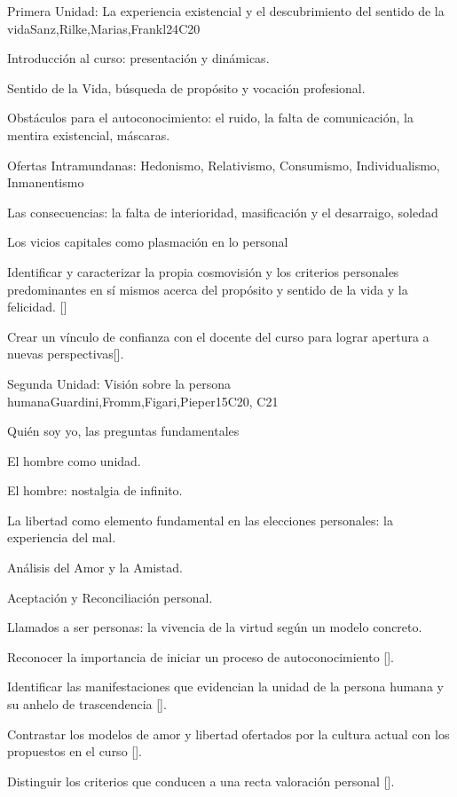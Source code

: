 \begin{syllabus}
\begin{unit}{}{Primera Unidad: La experiencia existencial y el descubrimiento del sentido de la vida}{Sanz,Rilke,Marias,Frankl}{24}{C20}
\begin{topics}
	\item Introducción al curso: presentación y dinámicas.
	\item Sentido de la Vida, búsqueda de propósito y vocación profesional.
	\item Obstáculos para el autoconocimiento: el ruido, la falta de comunicación, la mentira existencial, máscaras.
	\item Ofertas Intramundanas: Hedonismo, Relativismo, Consumismo, Individualismo, Inmanentismo
	\item Las consecuencias: la falta de interioridad, masificación y el desarraigo, soledad
	\item Los vicios capitales como plasmación en lo personal
\end{topics}
\begin{learningoutcomes}
	\item Identificar y caracterizar la propia cosmovisión y los criterios personales predominantes en sí mismos acerca del propósito y sentido de la vida y la felicidad. [\Usage]
	\item Crear un vínculo de confianza con el docente del curso para lograr apertura a nuevas perspectivas[\Usage].
\end{learningoutcomes}
\end{unit}

\begin{unit}{}{Segunda Unidad: Visión sobre la persona humana}{Guardini,Fromm,Figari,Pieper}{15}{C20, C21}
\begin{topics}
	\item Quién soy yo, las preguntas fundamentales
	\item El hombre como unidad.
	\item El hombre: nostalgia de infinito.
	\item La libertad como elemento fundamental en las elecciones personales: la experiencia del mal.
	\item Análisis del Amor y la Amistad.
	\item Aceptación y Reconciliación personal.
    \item Llamados a ser personas: la vivencia de la virtud según un modelo concreto.
\end{topics}
\begin{learningoutcomes}
	\item Reconocer la importancia de iniciar un proceso de autoconocimiento [\Usage].
	\item Identificar las manifestaciones que evidencian la unidad de la persona humana y su anhelo de trascendencia [\Usage].
    \item Contrastar los modelos de amor y libertad ofertados por la cultura actual con los propuestos en el curso [\Usage].
    \item Distinguir los criterios que conducen a una recta valoración personal [\Usage].
\end{learningoutcomes}
\end{unit}


\end{syllabus}
